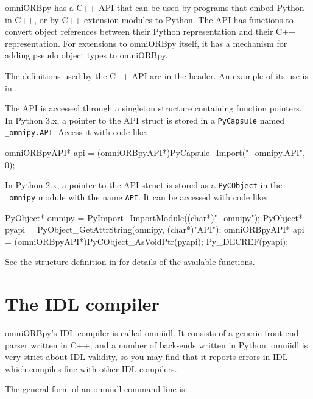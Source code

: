 \documentclass[11pt,oneside,a4paper]{book}
\newcommand{\module}[1]{\texttt{#1}}
\newcommand{\code}[1]{\texttt{#1}}
\begin{document}
omniORBpy has a C++ API that can be used by programs that embed Python
in C++, or by C++ extension modules to Python. The API has functions
to convert object references between their Python representation and
their C++ representation. For extensions to omniORBpy itself, it has a
mechanism for adding pseudo object types to omniORBpy.

The definitions used by the C++ API are in the 
header. An example of its use is in .

The API is accessed through a singleton structure containing function
pointers. In Python 3.x, a pointer to the API struct is stored in a
\code{PyCapsule} named \code{\_omnipy.API}. Access it with code like:

\begin{cxxlisting}
omniORBpyAPI* api = (omniORBpyAPI*)PyCapsule_Import("_omnipy.API", 0);
\end{cxxlisting}

\noindent In Python 2.x, a pointer to the API struct is stored as a
\code{PyCObject} in the \module{\_omnipy} module with the name
\code{API}. It can be accessed with code like:

\begin{cxxlisting}
PyObject*     omnipy = PyImport_ImportModule((char*)"_omnipy");
PyObject*     pyapi  = PyObject_GetAttrString(omnipy, (char*)"API");
omniORBpyAPI* api    = (omniORBpyAPI*)PyCObject_AsVoidPtr(pyapi);
Py_DECREF(pyapi);
\end{cxxlisting}

\noindent See the structure definition in  for
details of the available functions.



\chapter{The IDL compiler}
\label{chap:omniidl}

omniORBpy's IDL compiler is called omniidl. It consists of a generic
front-end parser written in C++, and a number of back-ends written in
Python. omniidl is very strict about IDL validity, so you may find
that it reports errors in IDL which compiles fine with other IDL
compilers.

The general form of an omniidl command line is:
\end{document}
